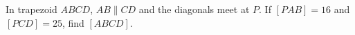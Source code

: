 In trapezoid $ABCD$, $AB\parallel CD$ and the diagonals meet at $P$. If $[PAB]=16$ and $[PCD]=25$, find $[ABCD]$.
